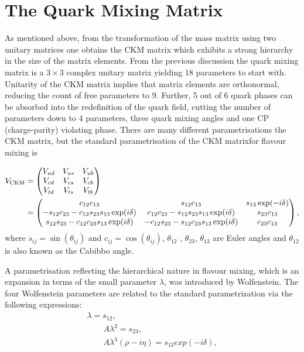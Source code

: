 



\section{The Quark Mixing Matrix}
\label{ckm}
As mentioned above, from the transformation of the mass matrix using two unitary matrices one obtains the \gls{CKM} matrix which exhibits a strong hierarchy in the size of the matrix elements. From the previous discussion the quark mixing matrix is a $3 \times 3$ complex unitary matrix yielding 18 parameters to start with. Unitarity of the \gls{CKM} matrix implies that matrix elements are orthonormal, reducing the count of free parameters to 9. Further, 5 out of 6 quark phases can be absorbed into the redefinition of the quark field, cutting the number of parameters down to 4 parameters, three quark mixing angles and one CP (charge-parity) violating phase. There are many different parametrisations \DIFdelbegin {}\DIFdelend \DIFaddbegin {}\DIFaddend the \gls{CKM} matrix, but the standard parametrisation of the \gls{CKM} matrix\DIFaddbegin {}\DIFaddend for flavour mixing is

\begin{align}
V_{\rm CKM} &=  \begin{pmatrix}   V_{ud} & V_{us} & V_{ub} \cr
    V_{cd} & V_{cs} & V_{cb} \cr
    V_{td} & V_{ts} & V_{tb} \cr \end{pmatrix} \\
 &= \begin{pmatrix}c_{12}c_{13}& s_{12}c_{13} & s_{13}\exp(-i\delta) \cr
-s_{12}c_{23}-c_{12}s_{23}s_{13}\exp(i\delta) & c_{12}c_{23}- 
s_{12}s_{23}s_{13}\exp(i\delta) & s_{23}c_{13} \cr 
s_{12}s_{23}- c_{12}c_{23}s_{13}\exp(i\delta) & 
-c_{12}s_{23}-s_{12}c_{23}s_{13}\exp(i\delta) & c_{23}c_{13}\end{pmatrix},
\end{align}
where $s_{ij} = \sin(\theta_{ij})$ and $c_{ij} = \cos(\theta_{ij})$, $\theta_{12}$ , $\theta_{23}$, $\theta_{13}$ are Euler angles and $\theta_{12}$ is also known as the Cabibbo angle.

A parametrisation reflecting the hierarchical nature in flavour mixing, which is an expansion in terms of the small parameter $\lambda$, was introduced by Wolfenstein\cite{wolf}. The four Wolfenstein parameters are related to the standard parametrization via the following expressions:
\begin{equation}
\begin{split}
\lambda = s_{12}, \\
\qquad
A\lambda^{2} = s_{23}, \\
\qquad
A\lambda^{3}(\rho - i\eta) = s_{13}exp(-i\delta),\\
\end{split}
\end{equation}

